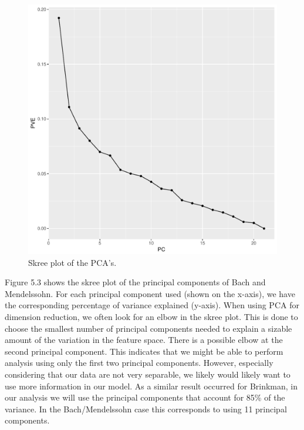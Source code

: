 \documentclass[12pt,twoside]{reedthesis}
\theoremstyle{definition}
\theoremstyle{definition}
\theoremstyle{definition}
\theoremstyle{remark}
\begin{document}
\begin{figure}[H]
\centering
\includegraphics[scale = .7]{images/skree_b.pdf}
\caption{Skree plot of the PCA's.}
\label{subd}
\end{figure}
Figure 5.3 shows the skree plot of the principal components of Bach and
Mendelssohn. For each principal component used (shown on the x-axis), we
have the corresponding percentage of variance explained (y-axis). When
using PCA for dimension reduction, we often look for an elbow in the
skree plot. This is done to choose the smallest number of principal
components needed to explain a sizable amount of the variation in the
feature space. There is a possible elbow at the second principal
component. This indicates that we might be able to perform analysis
using only the first two principal components. However, especially
considering that our data are not very separable, we likely would likely
want to use more information in our model. As a similar result occurred
for Brinkman, in our analysis we will use the principal components that
account for 85\% of the variance. In the Bach/Mendelssohn case this
corresponds to using 11 principal components.
\end{document}
